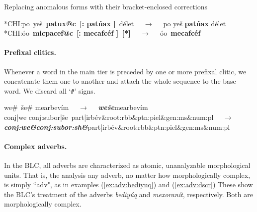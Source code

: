 \begin{exe}\label{ex:replace}
	\ex Replacing anomalous forms with their bracket-enclosed corrections
	\begin{xlist}
	   \ex \textsf{*\ac{CH}I:}\quad\textsf{po\, ye\v{s}\, \textbf{patux@c\, [: pat\'{u}ax ]}\, d\'{e}let} $\quad\to\quad$
	   \textsf{po ye\v{s} \textbf{pat\'{u}ax} d\'{e}let}
	   \ex \textsf{*\ac{CH}I:}\quad\textsf{\textglotstop\'{o}o\, \textbf{micpacef@c}\, \textbf{[: mecafc\'ef ]\, [*]}} $\quad\to\quad$ \textsf{\textglotstop\'oo\, \textbf{mecafc\'ef}}
	\end{xlist}
\end{exe} 

\paragraph{Prefixal clitics.}
Whenever a word in the main tier is preceded by one or more prefixal clitic, we concatenate them one to another and attach the whole sequence to the base word. We discard all `\texttt{\#}' signs.
\begin{exe}\label{ex:preclitics}
	\ex
	\textsf{we\#\, \v{s}e\# mearbev\'im} $\quad\to\quad$ \textbf{\textit{\textsf{we\v{s}e}}}\textsf{mearbev\'im}\\
	\textsf{conj|we conj:subor|\v{s}e\, part|irb\'ev\&root:rbb\&ptn:piel\&gen:ms\&num:pl} $\quad\to\quad$  \\
	\textit{\textbf{\textsf{conj:we\&conj:subor:sh\&}}}\textsf{part|irb\'ev\&root:rbb\&ptn:piel\&gen:ms\&num:pl}
\end{exe}

\paragraph{Complex adverbs.} In the \ac{BLC}, all adverbs are characterized as atomic, unanalyzable morphological units. That is,
the analysis any adverb, no matter how morphologically complex, is simply ``adv", as in 
examples (\ref{ex:adv:bediyuq}) and (\ref{ex:adv:dscr})  These show the \ac{BLC}'s treatment of the adverbs \textit{\textsf{bediy\'{u}q}} and \textit{\textsf{mexoran\'{i}t}}, respectively. Both are 
morphologically complex.

